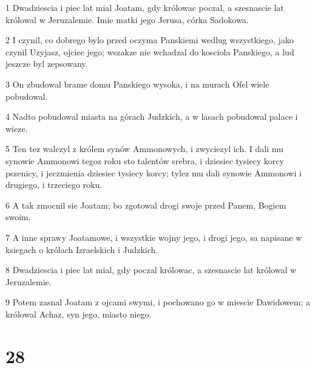 \par 1 Dwadziescia i piec lat mial Joatam, gdy królowac poczal, a szesnascie lat królowal w Jeruzalemie. Imie matki jego Jerusa, córka Sadokowa.
\par 2 I czynil, co dobrego bylo przed oczyma Panskiemi wedlug wszystkiego, jako czynil Uzyjasz, ojciec jego; wszakze nie wchadzal do kosciola Panskiego, a lud jeszcze byl zepsowany.
\par 3 On zbudowal brame domu Panskiego wysoka, i na murach Ofel wiele pobudowal.
\par 4 Nadto pobudowal miasta na górach Judzkich, a w lasach pobudowal palace i wieze.
\par 5 Ten tez walczyl z królem synów Ammonowych, i zwyciezyl ich. I dali mu synowie Ammonowi tegoz roku sto talentów srebra, i dziesiec tysiecy korcy pszenicy, i jeczmienia dziesiec tysiecy korcy; tylez mu dali synowie Ammonowi i drugiego, i trzeciego roku.
\par 6 A tak zmocnil sie Joatam; bo zgotowal drogi swoje przed Panem, Bogiem swoim.
\par 7 A inne sprawy Joatamowe, i wszystkie wojny jego, i drogi jego, sa napisane w ksiegach o królach Izraelskich i Judzkich.
\par 8 Dwadziescia i piec lat mial, gdy poczal królowac, a szesnascie lat królowal w Jeruzalemie.
\par 9 Potem zasnal Joatam z ojcami swymi, i pochowano go w miescie Dawidowem; a królowal Achaz, syn jego, miasto niego.

\chapter{28}


